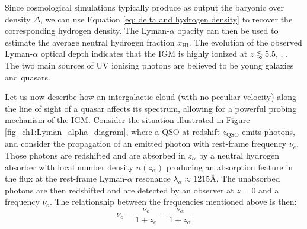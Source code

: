 Since cosmological simulations typically produce as output the baryonic over density $\Delta$, we can use Equation \ref{eq: delta and hydrogen density} to recover the corresponding hydrogen density. The Lyman-$\alpha$ opacity can then be used to estimate the average neutral hydrogen fraction $x_\text{HI}$. The evolution of the observed Lyman-$\alpha$ optical depth indicates that the IGM is highly ionized at $z\lessapprox 5.5$, \cite{Becker_2001_GP_trough}, \cite{Ian_model_inde_reio}. The two main sources of UV ionising photons are believed to be young galaxies and quasars.




















Let us now describe how an intergalactic cloud (with no peculiar velocity) along the line of sight of a quasar affects its spectrum, allowing for a powerful probing mechanism of the IGM. Consider the situation illustrated in Figure \ref{fig_ch1:Lyman_alpha_diagram}, where a QSO at redshift $z_\text{QSO}$ emits photons, and consider the propagation of an emitted photon with rest-frame frequency $\nu_e$. Those photons are redshifted and are absorbed in $z_\alpha$ by a neutral hydrogen absorber with local number density $n(z_\alpha)$ producing an absorption feature in the flux at the rest-frame Lyman-$\alpha$ resonance $\lambda_\alpha \approx 1215$\r{A}. The unabsorbed photons are then redshifted and are detected by an observer at $z=0$ and a frequency $\nu_o$. The relationship between the frequencies mentioned above is then:
\begin{equation}
    \nu_o=\frac{\nu_e}{1+z_e}=\frac{\nu_\alpha}{1+z_\alpha} 
\end{equation}


